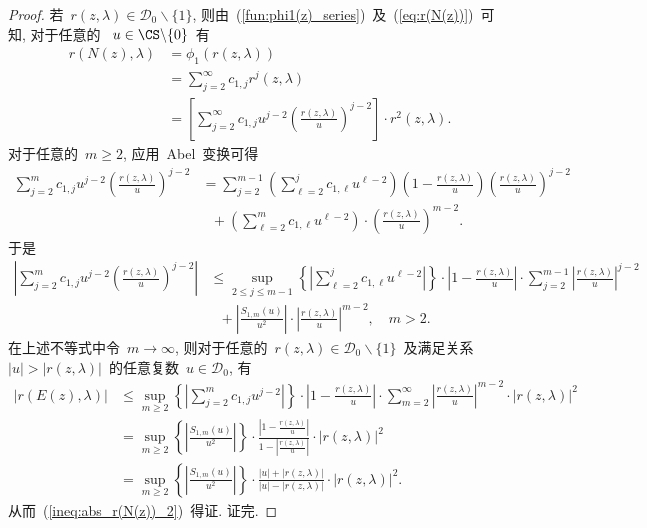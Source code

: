 \begin{proof}
若~$r(z,\lambda) \in \mathcal {D}_0\backslash\{1\}$,
则由~(\ref{fun:phi1(z)_series})~及~(\ref{eq:r(N(z))})~可知,
对于任意的 ~$u \in \CS\backslash\{0\}$~有
\begin{align*}
r(N(z),\lambda) & = \phi_1(r(z,\lambda))\\
& = \sum_{j=2}^\infty c_{1,j} r^j(z,\lambda)\\
& = \left[\sum_{j=2}^\infty c_{1,j} u^{j-2}
\left(\frac{r(z,\lambda)}{u}\right)^{j-2}\right] \cdot
r^2(z,\lambda).
\end{align*}
对于任意的~$m \geq 2$, 应用~Abel~变换可得
\begin{align*}
\sum_{j=2}^m c_{1,j} u^{j-2}
\left(\frac{r(z,\lambda)}{u}\right)^{j-2} & = \sum_{j=2}^{m-1}
\left(\sum_{\ell=2}^j c_{1,\ell} u^{\ell-2}\right)\left(1 -
\frac{r(z,\lambda)}{u}\right)\left(\frac{r(z,\lambda)}{u}\right)^{j-2}\\
& \ \ \ + \left(\sum_{\ell = 2}^m c_{1,\ell} u^{\ell-2}\right)\cdot
\left(\frac{r(z,\lambda)}{u}\right)^{m-2}.
\end{align*}
于是
\begin{align*}
\left|\sum_{j=2}^m c_{1,j} u^{j-2}
\left(\frac{r(z,\lambda)}{u}\right)^{j-2}\right| & \leq \sup_{2\leq
j \leq m-1} \left\{\left|\sum_{\ell=2}^j c_{1,\ell}
u^{\ell-2}\right|\right\} \cdot \left|1 -
\frac{r(z,\lambda)}{u}\right| \cdot \sum_{j=2}^{m-1}
\left|\frac{r(z,\lambda)}{u}\right|^{j-2}\\
& \ \ \ + \left|\frac{S_{1,m}(u)}{u^2} \right|\cdot
\left|\frac{r(z,\lambda)}{u}\right|^{m-2}, \quad m >2.
\end{align*}
在上述不等式中令~$m \to \infty$, 则对于任意的~$r(z,\lambda) \in
\mathcal {D}_0\backslash\{1\}$~及满足关系~$|u|
> |r(z,\lambda)|$~的任意复数~$u
\in \mathcal {D}_0$, 有
\begin{align*}
|r(E(z),\lambda)| & \leq \sup_{m \geq 2} \left\{\left|\sum_{j=2}^m
c_{1,j} u^{j-2}\right|\right\} \cdot \left|1 -
\frac{r(z,\lambda)}{u}\right| \cdot
\sum_{m=2}^\infty \left|\frac{r(z,\lambda)}{u}\right|^{m-2}\cdot |r(z,\lambda)|^2 \\
& = \sup_{m \geq 2}
\left\{\left|\frac{S_{1,m}(u)}{u^2}\right|\right\} \cdot
\frac{\left|1 - \frac{r(z,\lambda)}{u}\right|}{1 -
\left|\frac{r(z,\lambda)}{u}\right|} \cdot |r(z,\lambda)|^2 \\
& = \sup_{m \geq 2}
\left\{\left|\frac{S_{1,m}(u)}{u^2}\right|\right\} \cdot \frac{|u| +
|r(z,\lambda)|}{|u| - \left|r(z,\lambda)\right|} \cdot
|r(z,\lambda)|^2.
\end{align*}
从而~(\ref{ineq:abs_r(N(z))_2})~得证. 证完.
\end{proof}



